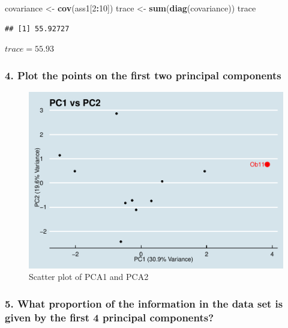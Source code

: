 \documentclass[
  8pt,
]{article}
\newenvironment{Shaded}{\begin{snugshade}}{\end{snugshade}}
\newcommand{\DecValTok}[1]{\textcolor[rgb]{0.00,0.00,0.81}{#1}}
\newcommand{\KeywordTok}[1]{\textcolor[rgb]{0.13,0.29,0.53}{\textbf{#1}}}
\newcommand{\NormalTok}[1]{#1}
\newcommand{\OperatorTok}[1]{\textcolor[rgb]{0.81,0.36,0.00}{\textbf{#1}}}
\newcommand{\StringTok}[1]{\textcolor[rgb]{0.31,0.60,0.02}{#1}}
\begin{document}
\begin{Shaded}
\begin{Highlighting}[]
\NormalTok{covariance <-}\StringTok{ }\KeywordTok{cov}\NormalTok{(ass1[}\DecValTok{2}\OperatorTok{:}\DecValTok{10}\NormalTok{])}
\NormalTok{trace <-}\StringTok{ }\KeywordTok{sum}\NormalTok{(}\KeywordTok{diag}\NormalTok{(covariance))}
\NormalTok{trace}
\end{Highlighting}
\end{Shaded}

\begin{verbatim}
## [1] 55.92727
\end{verbatim}

\(trace = 55.93\)

\hypertarget{plot-the-points-on-the-first-two-principal-components}{%
\subsubsection{4. Plot the points on the first two principal
components}\label{plot-the-points-on-the-first-two-principal-components}}

\begin{figure}

{\centering \includegraphics[width=0.65\linewidth,height=0.65\textheight]{Report_files/figure-latex/1.4-1} 

}

\caption{Scatter plot of PCA1 and PCA2}\label{fig:1.4}
\end{figure}

\hypertarget{what-proportion-of-the-information-in-the-data-set-is-given-by-the-first-4-principal-components}{%
\subsubsection{5. What proportion of the information in the data set is
given by the first 4 principal
components?}\label{what-proportion-of-the-information-in-the-data-set-is-given-by-the-first-4-principal-components}}
\end{document}
